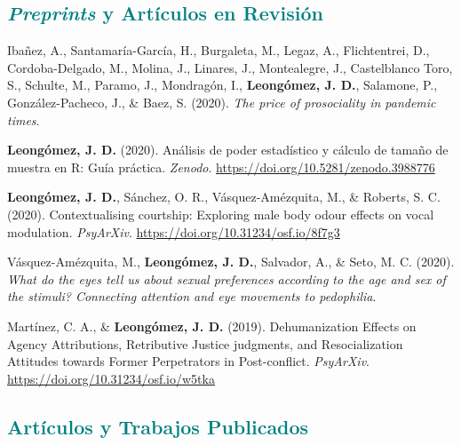 \documentclass[11pt, a4paper]{awesome-cv}
\begin{document}
\hypertarget{section}{%
\subsection{\texorpdfstring{\textcolor{teal}{\textit{Preprints} y Artículos en Revisión}}{}}\label{section}}

\begingroup
\setlength{\parindent}{-0.5in}
\setlength{\leftskip}{0.5in}

\hypertarget{refs_working_paper}{}
\leavevmode\hypertarget{ref-Ibanez2020}{}%
Ibañez, A., Santamaría-García, H., Burgaleta, M., Legaz, A.,
Flichtentrei, D., Cordoba-Delgado, M., Molina, J., Linares, J.,
Montealegre, J., Castelblanco Toro, S., Schulte, M., Paramo, J.,
Mondragón, I., \textbf{Leongómez, J. D.}, Salamone, P.,
González-Pacheco, J., \& Baez, S. (2020). \emph{{The price of
prosociality in pandemic times}}.

\leavevmode\hypertarget{ref-Leongomez2020a}{}%
\textbf{Leongómez, J. D.} (2020). {Análisis de poder estadístico y
cálculo de tamaño de muestra en R: Guía práctica}. \emph{Zenodo}.
\url{https://doi.org/10.5281/zenodo.3988776}

\leavevmode\hypertarget{ref-Leongomez2020}{}%
\textbf{Leongómez, J. D.}, Sánchez, O. R., Vásquez-Amézquita, M., \&
Roberts, S. C. (2020). Contextualising courtship: Exploring male body
odour effects on vocal modulation. \emph{PsyArXiv}.
\url{https://doi.org/10.31234/osf.io/8f7g3}

\leavevmode\hypertarget{ref-Vasquez2021}{}%
Vásquez-Amézquita, M., \textbf{Leongómez, J. D.}, Salvador, A., \& Seto,
M. C. (2020). \emph{{What do the eyes tell us about sexual preferences
according to the age and sex of the stimuli? Connecting attention and
eye movements to pedophilia}}.

\leavevmode\hypertarget{ref-Martinez2019}{}%
Martínez, C. A., \& \textbf{Leongómez, J. D.} (2019). Dehumanization
{Effects} on {Agency Attributions}, {Retributive Justice} judgments, and
{Resocialization Attitudes} towards {Former Perpetrators} in
{Post}-conflict. \emph{PsyArXiv}.
\url{https://doi.org/10.31234/osf.io/w5tka}

\endgroup

\hypertarget{section-1}{%
\subsection{\texorpdfstring{\textcolor{teal}{Artículos y Trabajos Publicados}}{}}\label{section-1}}

\begingroup
\setlength{\parindent}{-0.5in}
\setlength{\leftskip}{0.5in}
\end{document}
